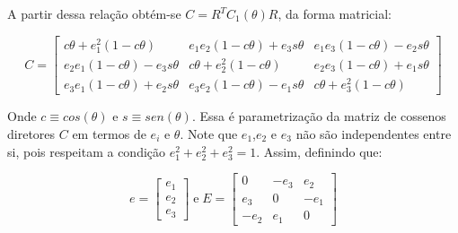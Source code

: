A partir dessa relação obtém-se \begin{math}C=R^TC_1(\theta)R\end{math}, da forma matricial:

\begin{equation}
C=\begin{bmatrix}
c\theta+e_1^2(1-c\theta) & e_1e_2(1-c\theta)+e_3s\theta  & e_1e_3(1-c\theta)-e_2s\theta \\ e_2e_1(1-c\theta)-e_3s\theta  &c\theta+e_2^2(1-c\theta)  & e_2e_3(1-c\theta)+e_1s\theta \\e_3e_1(1-c\theta)+e_2s\theta  &e_3e_2(1-c\theta)-e_1s\theta  &c\theta+e^2_3(1-c\theta) 
\end{bmatrix}
\end{equation}

Onde \begin{math}c\equiv cos(\theta)\end{math} e \begin{math}s\equiv sen(\theta)\end{math}. Essa é parametrização da matriz de cossenos diretores \begin{math}C\end{math} em termos de \begin{math}e_i\end{math} e \begin{math}\theta\end{math}. Note que \begin{math}e_1\end{math},\begin{math}e_2\end{math} e \begin{math}e_3\end{math} não são independentes entre si, pois respeitam a condição \begin{math}e_1^2+e_2^2+e_3^2=1\end{math}. Assim, definindo que:

\begin{equation}e=\begin{bmatrix}
e_1 \\ e_2 \\ e_3
\end{bmatrix} \; \text{e} \;  E=\begin{bmatrix}
0 & -e_3 & e_2 \\
e_3 & 0 & -e_1 \\
-e_2 & e_1 & 0
\end{bmatrix}
\end{equation}

